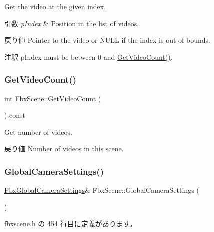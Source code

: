 Get the video at the given index. 
\begin{DoxyParams}{引数}
{\em p\+Index} & Position in the list of videos. \\
\hline
\end{DoxyParams}
\begin{DoxyReturn}{戻り値}
Pointer to the video or {\ttfamily N\+U\+LL} if the index is out of bounds. 
\end{DoxyReturn}
\begin{DoxyRemark}{注釈}
p\+Index must be between 0 and \hyperlink{class_fbx_scene_a203455f2e5a9b3891cae6eb516e71b15}{Get\+Video\+Count()}. 
\end{DoxyRemark}
\mbox{\label{class_fbx_scene_a203455f2e5a9b3891cae6eb516e71b15}} 
\subsubsection{\texorpdfstring{Get\+Video\+Count()}{GetVideoCount()}}
{\footnotesize\ttfamily int Fbx\+Scene\+::\+Get\+Video\+Count (\begin{DoxyParamCaption}{ }\end{DoxyParamCaption}) const}

Get number of videos. \begin{DoxyReturn}{戻り値}
Number of videos in this scene. 
\end{DoxyReturn}
\mbox{\label{class_fbx_scene_a029b34d23edd7d05cb0e687b494064ad}} 
\subsubsection{\texorpdfstring{Global\+Camera\+Settings()}{GlobalCameraSettings()}}
{\footnotesize\ttfamily \hyperlink{class_fbx_global_camera_settings}{Fbx\+Global\+Camera\+Settings}\& Fbx\+Scene\+::\+Global\+Camera\+Settings (\begin{DoxyParamCaption}{ }\end{DoxyParamCaption})\hspace{0.3cm}{\ttfamily [inline]}}



 fbxscene.\+h の 454 行目に定義があります。

